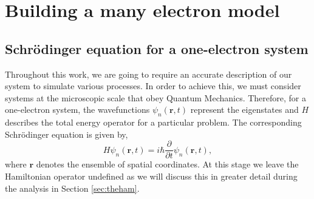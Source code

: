 
\chapter{Building a many electron model} %

\label{cha:many} %



\section{Schr\"odinger equation for a one-electron system}\label{sec:TISE}
Throughout this work, we are going to require an accurate description of our system to simulate various processes. In order to achieve this, we must consider systems at the microscopic scale that obey Quantum Mechanics. Therefore, for a one-electron system, the wavefunctions $\psi_n(\boldsymbol{r},t)$ represent the eigenstates and $H$ describes the total energy operator for a particular problem. The corresponding Schr\"{o}dinger equation is given by,
	\begin{equation}\label{eq:many_TDSE}
	H\psi_n(\boldsymbol{r},t)=i\hbar\frac{\partial}{\partial t}\psi_n(\boldsymbol{r},t),
	\end{equation}
where $\boldsymbol{r}$ denotes the ensemble of spatial coordinates. At this stage we leave the Hamiltonian operator undefined as we will discuss this in greater detail during the analysis in Section \ref{sec:theham}.

